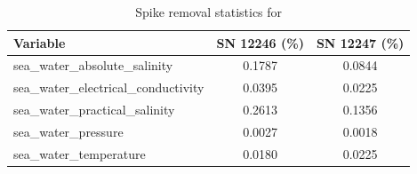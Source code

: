 \begin{table}[h]
\centering
\caption{Spike removal statistics for \projectname{} \casenumber{}}
\label{tab:ntas19_spike_stats}
\begin{tabular}{|l|c|c|}
\hline
Variable & SN 12246 (\%) & SN 12247 (\%) \\
\hline
sea\_water\_absolute\_salinity & 0.1787 & 0.0844 \\
sea\_water\_electrical\_conductivity & 0.0395 & 0.0225 \\
sea\_water\_practical\_salinity & 0.2613 & 0.1356 \\
sea\_water\_pressure & 0.0027 & 0.0018 \\
sea\_water\_temperature & 0.0180 & 0.0225 \\
\hline
\end{tabular}
\end{table}
